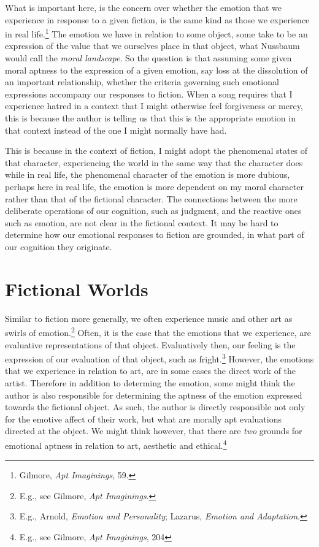 \documentclass[phdthesis,12pt,final,a4paper]{wuthesis}
\theoremstyle{definition}
\theoremstyle{definition}
\theoremstyle{definition}
\theoremstyle{definition}
\theoremstyle{remark}
\begin{document}
What is important here, is the concern over whether the emotion that we experience in response to a given fiction, is the same kind as those we experience in real life.\footnote{Gilmore, \emph{Apt {Imaginings}}, 59.} The emotion we have in relation to some object, some take to be an expression of the value that we ourselves place in that object, what Nussbaum would call the \emph{moral landscape}. So the question is that assuming some given moral aptness to the expression of a given emotion, say loss at the dissolution of an important relationship, whether the criteria governing such emotional expressions accompany our responses to fiction. When a song requires that I experience hatred in a context that I might otherwise feel forgiveness or mercy, this is because the author is telling us that this is the appropriate emotion in that context instead of the one I might normally have had.

This is because in the context of fiction, I might adopt the phenomenal states of that character, experiencing the world in the same way that the character does while in real life, the phenomenal character of the emotion is more dubious, perhaps here in real life, the emotion is more dependent on my moral character rather than that of the fictional character. The connections between the more deliberate operations of our cognition, such as judgment, and the reactive ones such as emotion, are not clear in the fictional context. It may be hard to determine how our emotional responses to fiction are grounded, in what part of our cognition they originate.

\section{Fictional Worlds}\label{fictional-worlds}

Similar to fiction more generally, we often experience music and other art as swirls of emotion.\footnote{E.g., see Gilmore, \emph{Apt {Imaginings}}.} Often, it is the case that the emotions that we experience, are evaluative representations of that object. Evaluatively then, our feeling is the expression of our evaluation of that object, such as fright.\footnote{E.g., Arnold, \emph{Emotion and {Personality}}; Lazarus, \emph{Emotion and Adaptation}.} However, the emotions that we experience in relation to art, are in some cases the direct work of the artist. Therefore in addition to determing the emotion, some might think the author is also responsible for determining the aptness of the emotion expressed towards the fictional object. As such, the author is directly responsible not only for the emotive affect of their work, but what are morally apt evaluations directed at the object. We might think however, that there are \emph{two} grounds for emotional aptness in relation to art, aesthetic and ethical.\footnote{E.g., see Gilmore, \emph{Apt {Imaginings}}, 204}
\end{document}
